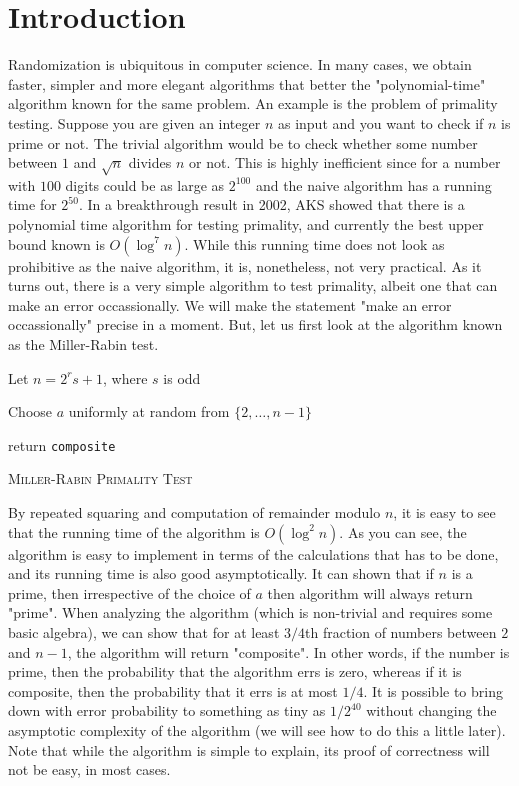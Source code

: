 \chapter{Introduction}

Randomization is ubiquitous in computer science. In many cases, we obtain faster, simpler and more elegant algorithms that better the "polynomial-time" algorithm known for the same problem. An example is the problem of primality testing. Suppose you are given an integer $n$ as input and you want to check if $n$ is prime or not. The trivial algorithm would be to check whether  some number between $1$ and $\sqrt{n}$ divides $n$ or not. This is highly inefficient since for a number with $100$ digits could be as large as $2^{100}$ and the naive algorithm has a running time for $2^{50}$. In a breakthrough result in 2002, AKS showed that there is a polynomial time algorithm for testing primality, and currently the best upper bound known is $O(\log^7 n)$. While this running time does not look as prohibitive as the naive algorithm, it is, nonetheless, not very practical. As it turns out, there is a very simple algorithm to test primality, albeit one that can make an error occassionally. We will make the statement "make an error occassionally" precise in a moment. But, let us first look at the algorithm known as the Miller-Rabin test.

\begin{algorithm}
	\BlankLine
	
	Let $n = 2^rs+1$, where $s$ is odd
	
	Choose $a$ uniformly at random from $\{2, \ldots, n-1\}$
	
	

	return \texttt{composite}
	\caption{\textsc{Miller-Rabin Primality Test}}
	\label{alg:primality}
\end{algorithm}

By repeated squaring and computation of remainder modulo $n$, it is easy to see that the running time of the algorithm is $O(\log^2 n)$. As you can see, the algorithm is easy to implement in terms of the calculations that has to be done, and its running time is also good asymptotically. It can shown that if $n$ is a prime, then irrespective of the choice of $a$ then algorithm will always return "prime". When analyzing the algorithm (which is non-trivial and requires some basic algebra), we can show that for at least $3/4$th fraction of numbers between $2$ and $n-1$, the algorithm will return "composite". In other words, if the number is prime, then the probability that the algorithm errs is zero, whereas if it is composite, then the probability that it errs is at most $1/4$. It is possible to bring down with error probability to something as tiny as $1/2^40$ without changing the asymptotic complexity of the algorithm (we will see how to do this a little later). Note that while the algorithm is simple to explain, its proof of correctness will not be easy, in most cases. 

